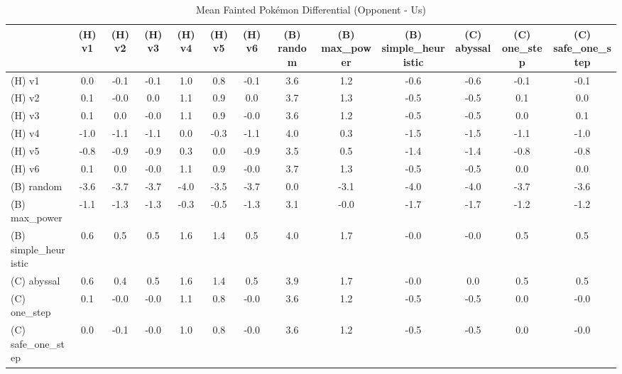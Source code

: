 \begin{table}[htbp]
\caption{Mean Fainted Pokémon Differential (Opponent - Us)}
\label{tab:fainted_diff}
\begin{tabular}{lcccccccccccc}
\hline
 & (H) v1 & (H) v2 & (H) v3 & (H) v4 & (H) v5 & (H) v6 & (B) random & (B) max\_power & (B) simple\_heuristic & (C) abyssal & (C) one\_step & (C) safe\_one\_step \\
\hline
(H) v1 & 0.0 & -0.1 & -0.1 & 1.0 & 0.8 & -0.1 & 3.6 & 1.2 & -0.6 & -0.6 & -0.1 & -0.1 \\
(H) v2 & 0.1 & -0.0 & 0.0 & 1.1 & 0.9 & 0.0 & 3.7 & 1.3 & -0.5 & -0.5 & 0.1 & 0.0 \\
(H) v3 & 0.1 & 0.0 & -0.0 & 1.1 & 0.9 & -0.0 & 3.6 & 1.2 & -0.5 & -0.5 & 0.0 & 0.1 \\
(H) v4 & -1.0 & -1.1 & -1.1 & 0.0 & -0.3 & -1.1 & 4.0 & 0.3 & -1.5 & -1.5 & -1.1 & -1.0 \\
(H) v5 & -0.8 & -0.9 & -0.9 & 0.3 & 0.0 & -0.9 & 3.5 & 0.5 & -1.4 & -1.4 & -0.8 & -0.8 \\
(H) v6 & 0.1 & 0.0 & -0.0 & 1.1 & 0.9 & -0.0 & 3.7 & 1.3 & -0.5 & -0.5 & 0.0 & 0.0 \\
(B) random & -3.6 & -3.7 & -3.7 & -4.0 & -3.5 & -3.7 & 0.0 & -3.1 & -4.0 & -4.0 & -3.7 & -3.6 \\
(B) max\_power & -1.1 & -1.3 & -1.3 & -0.3 & -0.5 & -1.3 & 3.1 & -0.0 & -1.7 & -1.7 & -1.2 & -1.2 \\
(B) simple\_heuristic & 0.6 & 0.5 & 0.5 & 1.6 & 1.4 & 0.5 & 4.0 & 1.7 & -0.0 & -0.0 & 0.5 & 0.5 \\
(C) abyssal & 0.6 & 0.4 & 0.5 & 1.6 & 1.4 & 0.5 & 3.9 & 1.7 & -0.0 & 0.0 & 0.5 & 0.5 \\
(C) one\_step & 0.1 & -0.0 & -0.0 & 1.1 & 0.8 & -0.0 & 3.6 & 1.2 & -0.5 & -0.5 & 0.0 & -0.0 \\
(C) safe\_one\_step & 0.0 & -0.1 & -0.0 & 1.0 & 0.8 & -0.0 & 3.6 & 1.2 & -0.5 & -0.5 & 0.0 & -0.0 \\
\hline
\end{tabular}
\end{table}

